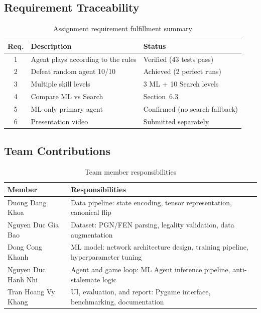 \documentclass[a4paper,12pt]{article}
\begin{document}
\subsection{Requirement Traceability}

\begin{table}[H]
\centering
\caption{Assignment requirement fulfillment summary}
\begin{tabularx}{\textwidth}{@{}cXl@{}}
\toprule
\textbf{Req.} & \textbf{Description} & \textbf{Status} \\
\midrule
1 & Agent plays according to the rules & Verified (43 tests pass) \\
2 & Defeat random agent 10/10 & Achieved (2 perfect runs) \\
3 & Multiple skill levels & 3 ML + 10 Search levels \\
4 & Compare ML vs Search & Section~6.3 \\
5 & ML-only primary agent & Confirmed (no search fallback) \\
6 & Presentation video & Submitted separately \\
\bottomrule
\end{tabularx}
\end{table}

\subsection{Team Contributions}

\begin{table}[H]
\centering
\caption{Team member responsibilities}
\begin{tabularx}{\textwidth}{@{}lX@{}}
\toprule
\textbf{Member} & \textbf{Responsibilities} \\
\midrule
Duong Dang Khoa & Data pipeline: state encoding, tensor representation, canonical flip \\
Nguyen Duc Gia Bao & Dataset: PGN/FEN parsing, legality validation, data augmentation \\
Dong Cong Khanh & ML model: network architecture design, training pipeline, hyperparameter tuning \\
Nguyen Duc Hanh Nhi & Agent and game loop: ML Agent inference pipeline, anti-stalemate logic \\
Tran Hoang Vy Khang & UI, evaluation, and report: Pygame interface, benchmarking, documentation \\
\bottomrule
\end{tabularx}
\end{table}
\end{document}
